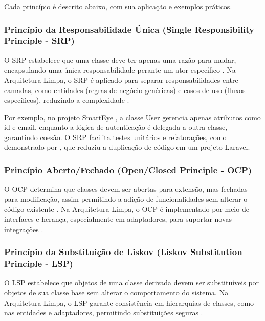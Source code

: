             \par Cada princípio é descrito abaixo, com sua aplicação e exemplos práticos.

            \subsubsection{Princípio da Responsabilidade Única (Single Responsibility Principle - SRP)}
                \par O SRP estabelece que uma classe deve ter apenas uma razão para mudar, encapsulando uma única responsabilidade perante um ator específico \cite{livro:martin:cleanarch}. Na Arquitetura Limpa, o SRP é aplicado para separar responsabilidades entre camadas, como entidades (regras de negócio genéricas) e casos de uso (fluxos específicos), reduzindo a complexidade \cite{livro:martin:cleanarch}. 
                
                \par Por exemplo, no projeto SmartEye \cite{artigo:dantas:2021}, a classe User gerencia apenas atributos como id e email, enquanto a lógica de autenticação é delegada a outra classe, garantindo coesão. O SRP facilita testes unitários e refatorações, como demonstrado por \cite{inproceedings:nugroho:2022}, que reduziu a duplicação de código em um projeto Laravel.

            \subsubsection{Princípio Aberto/Fechado (Open/Closed Principle - OCP)}

                \par O OCP determina que classes devem ser abertas para extensão, mas fechadas para modificação, assim permitindo a adição de funcionalidades sem alterar o código existente \cite{livro:martin:cleanarch}. Na Arquitetura Limpa, o OCP é implementado por meio de interfaces e herança, especialmente em adaptadores, para suportar novas integrações \cite{livro:martin:cleanarch}. 

            \subsubsection{Princípio da Substituição de Liskov (Liskov Substitution Principle - LSP)}

                \par O LSP estabelece que objetos de uma classe derivada devem ser substituíveis por objetos de sua classe base sem alterar o comportamento do sistema. Na Arquitetura Limpa, o LSP garante consistência em hierarquias de classes, como nas entidades e adaptadores, permitindo substituições seguras \cite{livro:martin:cleanarch}.

